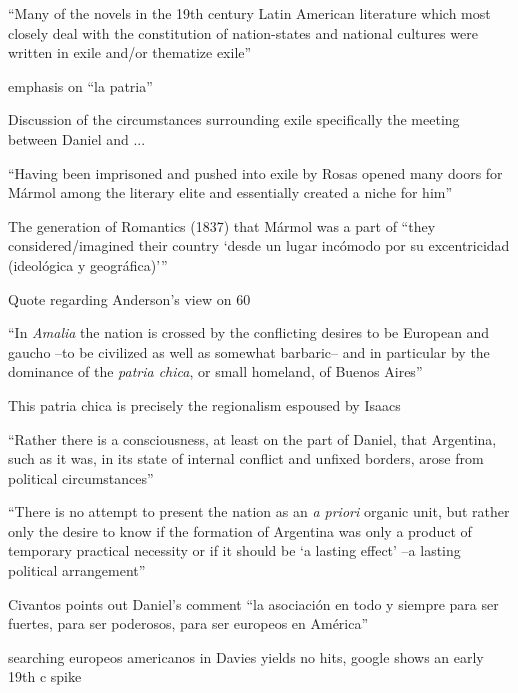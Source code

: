 \enquote{Many of the novels in the 19th century Latin American literature which most closely deal with the constitution of nation-states and national cultures were written in exile and/or thematize exile} \autocite[55]{Civantos2000}


emphasis on \enquote{la patria}

Discussion of the circumstances surrounding exile
specifically the meeting between Daniel and ...

\enquote{Having been imprisoned and pushed into exile by Rosas opened many doors for Mármol among the literary elite and essentially created a niche for him} \autocite[60]{Civantos2000}

The generation of Romantics (1837) that Mármol was a part of \enquote{they considered/imagined their country \enquote{desde un lugar incómodo por su excentricidad (ideológica y geográfica)}} \autocite[60]{Civantos2000}

Quote regarding Anderson's view on 60

\enquote{In \textit{Amalia} the nation is crossed by the conflicting desires to be European and gaucho --to be civilized as well as somewhat barbaric-- and in particular by the dominance of the \textit{patria chica}, or small homeland, of Buenos Aires} \autocite[60]{Civantos2000}

This patria chica is precisely the regionalism espoused by Isaacs

\enquote{Rather there is a consciousness, at least on the part of Daniel, that Argentina, such as it was, in its state of internal conflict and unfixed borders, arose from political circumstances} \autocite{Civantos2000}

\enquote{There is no attempt to present the nation as an \textit{a priori} organic unit, but rather only the desire to know if the formation of Argentina was only a product of temporary practical necessity or if it should be \enquote{a lasting effect} --a lasting political arrangement} \autocite[61]{Civantos2000}

Civantos points out Daniel's comment \enquote{la asociación en todo y siempre para ser fuertes, para ser poderosos, para ser europeos en América} \autocite[61]{Civantos2000}

searching europeos americanos in Davies yields no hits, google shows an early 19th c spike 

